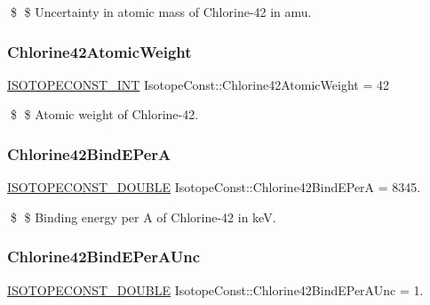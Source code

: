 \$ \$ Uncertainty in atomic mass of Chlorine-\/42 in amu. \mbox{\label{group___isotope_const-_chlorine-_cl42_ga63daa3cde77d41c08302ea88f2f0609b}} 
\subsubsection{\texorpdfstring{Chlorine42\+Atomic\+Weight}{Chlorine42AtomicWeight}}
{\footnotesize\ttfamily \mbox{\hyperlink{group___isotope_const-_macros_ga5f18360b3e99483a35c32d789e62621c}{I\+S\+O\+T\+O\+P\+E\+C\+O\+N\+S\+T\+\_\+\+I\+NT}} Isotope\+Const\+::\+Chlorine42\+Atomic\+Weight = 42}

\$ \$ Atomic weight of Chlorine-\/42. \mbox{\label{group___isotope_const-_chlorine-_cl42_ga40cad8a4a2389eace5ef7a4967a3f69f}} 
\subsubsection{\texorpdfstring{Chlorine42\+Bind\+E\+PerA}{Chlorine42BindEPerA}}
{\footnotesize\ttfamily \mbox{\hyperlink{group___isotope_const-_macros_ga8f45a7272ce02c0b4c65c44636ed719a}{I\+S\+O\+T\+O\+P\+E\+C\+O\+N\+S\+T\+\_\+\+D\+O\+U\+B\+LE}} Isotope\+Const\+::\+Chlorine42\+Bind\+E\+PerA = 8345.}

\$ \$ Binding energy per A of Chlorine-\/42 in keV. \mbox{\label{group___isotope_const-_chlorine-_cl42_gade9ee242429cfe07732af374cc37670d}} 
\subsubsection{\texorpdfstring{Chlorine42\+Bind\+E\+Per\+A\+Unc}{Chlorine42BindEPerAUnc}}
{\footnotesize\ttfamily \mbox{\hyperlink{group___isotope_const-_macros_ga8f45a7272ce02c0b4c65c44636ed719a}{I\+S\+O\+T\+O\+P\+E\+C\+O\+N\+S\+T\+\_\+\+D\+O\+U\+B\+LE}} Isotope\+Const\+::\+Chlorine42\+Bind\+E\+Per\+A\+Unc = 1.}

